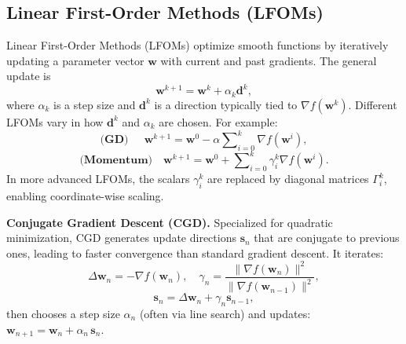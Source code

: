 \documentclass[11pt]{article}
\theoremstyle{plain}
\theoremstyle{definition}
\theoremstyle{remark}
\numberwithin{equation}{section}
\begin{document}
\subsection{Linear First-Order Methods (LFOMs)}
\label{sec:lfom}
Linear First-Order Methods (LFOMs) \citep{goh2017why} optimize smooth functions by iteratively updating a parameter vector \(\mathbf{w}\) with current and past gradients. The general update is
\begin{equation}\label{eq:2}
\mathbf{w}^{k+1} = \mathbf{w}^k + \alpha_k \mathbf{d}^k,
\end{equation}
where \(\alpha_k\) is a step size and \(\mathbf{d}^k\) is a direction typically tied to \(\nabla f(\mathbf{w}^k)\). Different LFOMs vary in how \(\mathbf{d}^k\) and \(\alpha_k\) are chosen. For example:
\[\textbf{(GD)}\quad\ \ 
\mathbf{w}^{k+1}
= \mathbf{w}^0 - \alpha \sum\nolimits_{i=0}^{k} \nabla f(\mathbf{w}^i),\]
\[\textbf{(Momentum)}\quad
\mathbf{w}^{k+1}
= \mathbf{w}^0 + \sum\nolimits_{i=0}^{k} \gamma_i^k \nabla f(\mathbf{w}^i).\]
In more advanced LFOMs, the scalars \(\gamma_i^k\) are replaced by diagonal matrices \(\Gamma_i^k\), enabling coordinate-wise scaling.

\textbf{Conjugate Gradient Descent (CGD).}
Specialized for quadratic minimization, CGD generates update directions \(\mathbf{s}_n\) that are conjugate to previous ones, leading to faster convergence than standard gradient descent. It iterates:
\begin{equation}\Delta \mathbf{w}_n = -\nabla f(\mathbf{w}_n), \quad
\gamma_n = \frac{\|\nabla f(\mathbf{w}_n)\|^2}{\|\nabla f(\mathbf{w}_{n-1})\|^2}\label{cgd-iterates},\end{equation}
\[\mathbf{s}_n = \Delta \mathbf{w}_n + \gamma_n \mathbf{s}_{n-1},\]
then chooses a step size \(\alpha_n\) (often via line search) and updates: \(\mathbf{w}_{n+1} = \mathbf{w}_n + \alpha_n \,\mathbf{s}_n.\)
\end{document}
